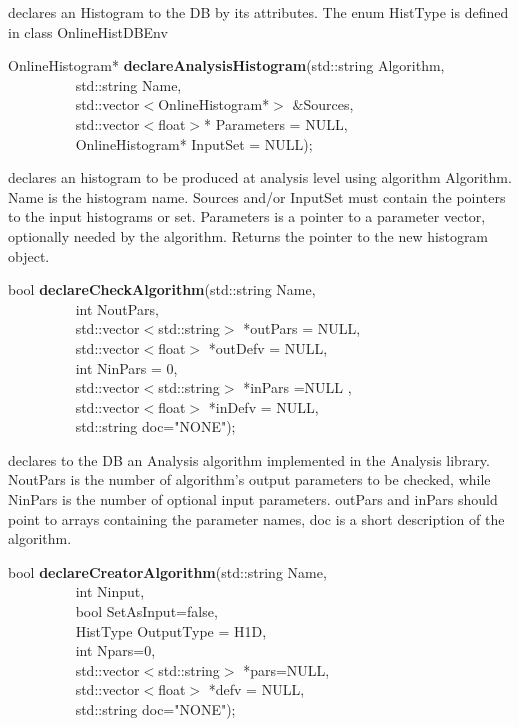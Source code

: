  declares an Histogram to the DB by its attributes.  The enum HistType is defined in class OnlineHistDBEnv


\item    OnlineHistogram* {\bf declareAnalysisHistogram}(std::string Algorithm,\\\mbox{}~~~~~~~~~
                                            std::string Name,\\\mbox{}~~~~~~~~~
                                            std::vector$<$OnlineHistogram*$>$ \&Sources,\\\mbox{}~~~~~~~~~
                                            std::vector$<$float$>$* Parameters = NULL,\\\mbox{}~~~~~~~~~
                                            OnlineHistogram* InputSet = NULL);

 declares an histogram to be produced at analysis
 level using algorithm Algorithm. Name is the histogram name. Sources
 and/or InputSet must contain the pointers to the input histograms or set. 
 Parameters is a
 pointer to a parameter vector, optionally needed by the algorithm. 
 Returns the pointer to the new histogram object.


\item    bool {\bf declareCheckAlgorithm}(std::string Name,\\\mbox{}~~~~~~~~~ 
                             int NoutPars,\\\mbox{}~~~~~~~~~ 
                             std::vector$<$std::string$>$ *outPars = NULL,\\\mbox{}~~~~~~~~~
			     std::vector$<$float$>$ *outDefv = NULL,\\\mbox{}~~~~~~~~~
                             int NinPars = 0,\\\mbox{}~~~~~~~~~ 
                             std::vector$<$std::string$>$ *inPars =NULL ,\\\mbox{}~~~~~~~~~
			     std::vector$<$float$>$ *inDefv = NULL,\\\mbox{}~~~~~~~~~
                             std::string doc="NONE");

 declares to the DB an Analysis algorithm implemented in the Analysis
 library. NoutPars is the number of algorithm's output parameters to be checked, 
 while NinPars is the number of optional input parameters.
 outPars and inPars should point to arrays containing the parameter names, 
 doc is a short description of the algorithm.


\item    bool {\bf declareCreatorAlgorithm}(std::string Name,\\\mbox{}~~~~~~~~~ 
			       int Ninput,\\\mbox{}~~~~~~~~~
			       bool SetAsInput=false,\\\mbox{}~~~~~~~~~
			       HistType OutputType = H1D,\\\mbox{}~~~~~~~~~
			       int Npars=0,\\\mbox{}~~~~~~~~~ 
			       std::vector$<$std::string$>$ *pars=NULL,\\\mbox{}~~~~~~~~~
			       std::vector$<$float$>$ *defv = NULL,\\\mbox{}~~~~~~~~~
			       std::string doc="NONE");

